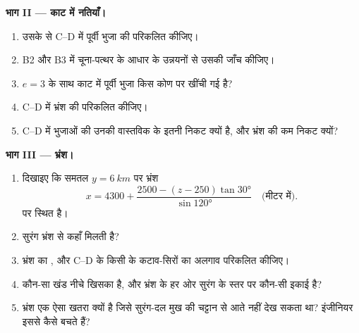 \begin{problem}[{सप्ताहांत समस्या --- कौन-सी चट्टानें सुरंग काटेगी, वह भ्रंश से कहाँ मिलेगी, और वह कितना चूना-पत्थर खोदेगी}]
\medskip
\noindent\textbf{भाग II --- काट में नतियाँ।}
\begin{enumerate}[resume]
  \item उसके  से C--D में पूर्वी भुजा की  परिकलित कीजिए।
  \item B2 और B3 में चूना-पत्थर के आधार के उन्नयनों से उसकी जाँच कीजिए।
  \item $e = 3$ के साथ काट में पूर्वी भुजा किस कोण पर खींची गई है?
  \item C--D में भ्रंश की  परिकलित कीजिए।
  \item C--D में भुजाओं की  उनकी वास्तविक  के इतनी निकट क्यों है, और भ्रंश की कम निकट क्यों?
\end{enumerate}

\medskip
\noindent\textbf{भाग III --- भ्रंश।}
\begin{enumerate}[resume]
  \item दिखाइए कि समतल $y = \qty{6}{km}$ पर भ्रंश
        \[ x = 4300 + \frac{2500 - (z - 250)\tan\ang{30}}{\sin\ang{120}}
           \quad\text{(मीटर में)}. \]
        पर स्थित है।
  \item सुरंग भ्रंश से कहाँ मिलती है?
  \item भ्रंश का , और C--D के किसी  के कटाव-सिरों का अलगाव परिकलित कीजिए।
  \item कौन-सा खंड नीचे खिसका है, और भ्रंश के हर ओर सुरंग के स्तर पर कौन-सी इकाई है?
  \item भ्रंश एक ऐसा खतरा क्यों है जिसे सुरंग-दल मुख की चट्टान से आते नहीं देख सकता था? इंजीनियर इससे कैसे बचते हैं?
\end{enumerate}


\end{problem}
